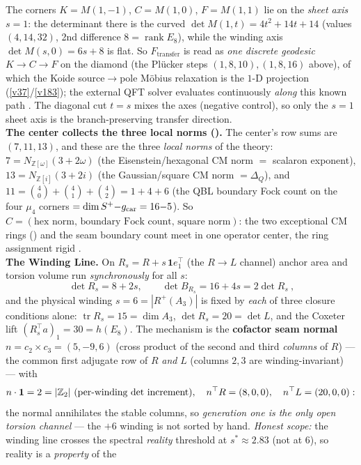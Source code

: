 \begin{winbox}
The corners $K{=}M(1,{-}1)$, $C{=}M(1,0)$, $F{=}M(1,1)$ lie on the \emph{sheet axis} $s{=}1$: the determinant
there is the curved $\det M(1,t)=4t^2{+}14t{+}14$ (values $(4,14,32)$, 2nd difference $8{=}\operatorname{rank}E_8$),
while the winding axis $\det M(s,0)=6s{+}8$ is flat. So $F_{\mathrm{transfer}}$ is read as \emph{one discrete
geodesic} $K\to C\to F$ on the diamond (the Pl\"ucker steps $(1,8,10),(1,8,16)$ above), of which the Koide
source$\to$pole M\"obius relaxation is the $1$-D projection (\vref{v37}/\vref{v183}); the external QFT solver
evaluates continuously \emph{along} this known path \mC. The diagonal cut $t{=}s$ mixes the axes (negative
control), so only the $s{=}1$ sheet axis is the branch-preserving transfer direction.
\smallskip\\
\noindent\textbf{The center collects the three local norms ().} The
center's row sums are $(7,11,13)$, and these are the three \emph{local norms} of the theory:
$7=N_{\mathbb Z[\omega]}(3{+}2\omega)$ (the Eisenstein/hexagonal CM norm $=$ scalaron exponent),
$13=N_{\mathbb Z[i]}(3{+}2i)$ (the Gaussian/square CM norm $=\Delta_Q$), and
$11=\binom40{+}\binom41{+}\binom42=1{+}4{+}6$ (the QBL boundary Fock count on the four $\mu_4$ corners
$=\dim S^+{-}g_{\mathrm{car}}=16{-}5$). So $C=(\text{hex norm},\,\text{boundary Fock count},\,\text{square norm})$: the
two exceptional CM rings () and the seam boundary count meet in one operator
center, the ring assignment rigid \mE.
\smallskip\\
\noindent\textbf{The Winding Line.} On $R_s=R+s\,\mathbf 1e_1^\top$ (the $R\to L$ channel) anchor area and
torsion volume run \emph{synchronously} for all $s$:
\[
  \boxed{\ \det R_s=8+2s,\qquad \det B_{R_s}=16+4s=2\det R_s\ },
\]
and the physical winding $s=6=|R^+(A_3)|$ is fixed by \emph{each} of three closure conditions alone:
$\operatorname{tr}R_s=15=\dim A_3$, $\det R_s=20=\det L$, and the Coxeter lift $(R_s^\top a)_1=30=h(E_8)$.
The mechanism is the \textbf{cofactor seam normal} $n=c_2{\times}c_3=(5,-9,6)$ (cross product of the
second and third \emph{columns} of $R$) --- the common first adjugate row of $R$ \emph{and} $L$ (columns
$2,3$ are winding-invariant) --- with
\[
  n\cdot\mathbf 1=2=|\mathbb{Z}_2|\ (\text{per-winding det increment}),\quad
  n^\top R=(8,0,0),\quad n^\top L=(20,0,0):
\]
the normal annihilates the stable columns, so \emph{generation one is the only open torsion channel} ---
the $+6$ winding is not sorted by hand. \emph{Honest scope:} the winding line crosses the spectral
\emph{reality} threshold at $s^*\!\approx\!2.83$ (not at $6$), so reality is a \emph{property} of the

\end{winbox}
